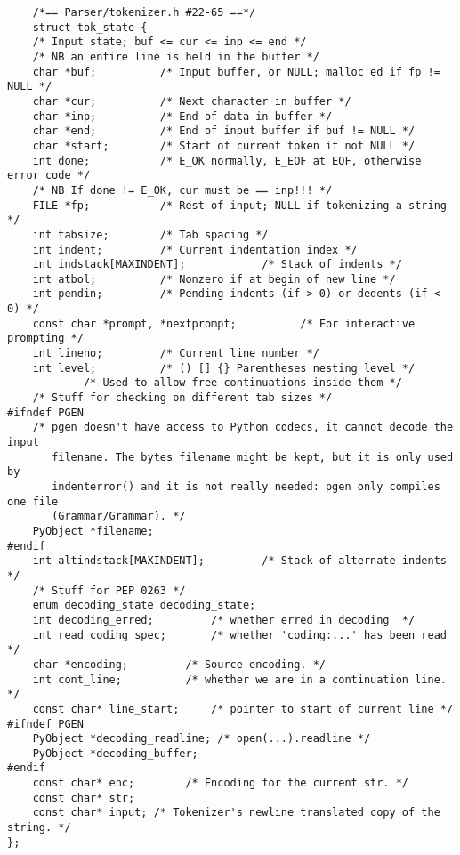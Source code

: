 \documentclass[UTF8]{book}
\begin{document}
\begin{lstlisting}
    /*== Parser/tokenizer.h #22-65 ==*/
    struct tok_state {
    /* Input state; buf <= cur <= inp <= end */
    /* NB an entire line is held in the buffer */
    char *buf;          /* Input buffer, or NULL; malloc'ed if fp != NULL */
    char *cur;          /* Next character in buffer */
    char *inp;          /* End of data in buffer */
    char *end;          /* End of input buffer if buf != NULL */
    char *start;        /* Start of current token if not NULL */
    int done;           /* E_OK normally, E_EOF at EOF, otherwise error code */
    /* NB If done != E_OK, cur must be == inp!!! */
    FILE *fp;           /* Rest of input; NULL if tokenizing a string */
    int tabsize;        /* Tab spacing */
    int indent;         /* Current indentation index */
    int indstack[MAXINDENT];            /* Stack of indents */
    int atbol;          /* Nonzero if at begin of new line */
    int pendin;         /* Pending indents (if > 0) or dedents (if < 0) */
    const char *prompt, *nextprompt;          /* For interactive prompting */
    int lineno;         /* Current line number */
    int level;          /* () [] {} Parentheses nesting level */
            /* Used to allow free continuations inside them */
    /* Stuff for checking on different tab sizes */
#ifndef PGEN
    /* pgen doesn't have access to Python codecs, it cannot decode the input
       filename. The bytes filename might be kept, but it is only used by
       indenterror() and it is not really needed: pgen only compiles one file
       (Grammar/Grammar). */
    PyObject *filename;
#endif
    int altindstack[MAXINDENT];         /* Stack of alternate indents */
    /* Stuff for PEP 0263 */
    enum decoding_state decoding_state;
    int decoding_erred;         /* whether erred in decoding  */
    int read_coding_spec;       /* whether 'coding:...' has been read  */
    char *encoding;         /* Source encoding. */
    int cont_line;          /* whether we are in a continuation line. */
    const char* line_start;     /* pointer to start of current line */
#ifndef PGEN
    PyObject *decoding_readline; /* open(...).readline */
    PyObject *decoding_buffer;
#endif
    const char* enc;        /* Encoding for the current str. */
    const char* str;
    const char* input; /* Tokenizer's newline translated copy of the string. */
};
\end{lstlisting}
\end{document}
